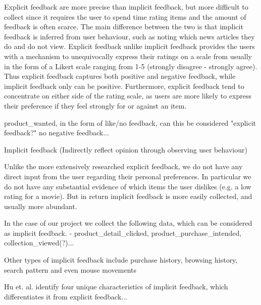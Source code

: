 Explicit feedback are more precise than implicit feedback, but more difficult to collect since it requires the user to spend time rating items and the amount of feedback is often scarce. The main difference between the two is that implicit feedback is inferred from user behaviour, such as noting which news articles they do and do not view. Explicit feedback unlike implicit feedback provides the users with a mechanism to unequivocally express their ratings on a scale from usually in the form of a Likert scale ranging from 1-5 (strongly disagree - strongly agree). Thus explicit feedback captures both positive and negative feedback, while implicit feedback only can be positive. Furthermore, explicit feedback tend to concentrate on either side of the rating scale, as users are more likely to express their preference if they feel strongly for or against an item.

product\_wanted, in the form of like/no feedback, can this be considered "explicit feedback?" no negative feedback...

Implicit feedback (Indirectly reflect opinion through observing user behaviour)

Unlike the more extensively researched explicit feedback, we do not have any
direct input from the user regarding their personal preferences. In particular
we do not have any substantial evidence of which items the user dislikes (e.g. a
low rating for a movie). But in return implicit feedback is more easily
collected, and usually more abundant.

In the case of our project we collect the following data, which can be considered as implicit feedback.
- product\_detail\_clicked, product\_purchase\_intended, collection\_viewed(?)...

Other types of implicit feedback include purchase history, browsing
history, search pattern and even mouse movements

Hu et. al. \cite{Hu2008} identify four unique characteristics of implicit feedback, which differentiates it from explicit feedback...

